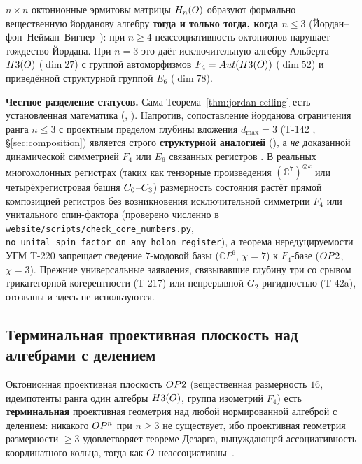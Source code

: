 \begin{theorem}
\label{thm:jordan-ceiling}
$n\times n$ октонионные эрмитовы матрицы $H_n(O)$ образуют
формально вещественную йорданову алгебру \textbf{тогда и только тогда, когда
$n\leq 3$} (Йордан--фон~Нейман--Вигнер~\cite{jordan1934}): при $n\geq 4$
неассоциативность октонионов нарушает тождество Йордана. При $n=3$ это даёт
исключительную алгебру Альберта $H3(O)$ ($\dim 27$) с группой автоморфизмов
$F_4=Aut(H3(O))$ ($\dim 52$) и приведённой структурной группой $E_6$
($\dim 78$).
\end{theorem}

\noindent\textbf{Честное разделение статусов.} Сама
Теорема~\ref{thm:jordan-ceiling} есть установленная математика (,
\cite{jordan1934,baez2002}). Напротив, сопоставление йорданова ограничения
ранга $n\le 3$ с проектным пределом глубины вложения $d_{\max}=3$ (T-142
, \S\ref{sec:composition}) является строго \textbf{структурной
аналогией} (), а \emph{не} доказанной динамической симметрией $F_4$
или $E_6$ связанных регистров \DM{}. В реальных многохолонных регистрах (таких
как тензорные произведения $(\mathbb{C}^7)^{\otimes k}$ или четырёхрегистровая
башня $C_0$--$C_3$) размерность состояния растёт прямой композицией
регистров без возникновения исключительной симметрии $F_4$ или унитального
спин-фактора (проверено численно в
\texttt{website/scripts/check\_core\_numbers.py},
\texttt{no\_unital\_spin\_factor\_on\_any\_holon\_register}), а теорема
нередуцируемости УГМ T-220 запрещает сведение $7$-модовой базы ($\mathbb{C}P^6$,
$\chi=7$) к $F_4$-базе ($OP2$, $\chi=3$). Прежние универсальные заявления,
связывавшие глубину три со срывом трикатегорной когерентности (T-217) или
непрерывной $G_2$-ригидностью (T-42a), отозваны и здесь не используются.

\subsection{Терминальная проективная плоскость над алгебрами с делением}
\label{subsec:terminal}

\begin{theorem}
\label{thm:terminal}
Октонионная проективная плоскость $OP2$ (вещественная размерность $16$,
идемпотенты ранга один алгебры $H3(O)$, группа изометрий $F_4$) есть
\textbf{терминальная} проективная геометрия над любой нормированной алгеброй с
делением: никакого $O P^n$ при $n\geq 3$ не существует, ибо проективная
геометрия размерности $\geq 3$ удовлетворяет теореме Дезарга, вынуждающей
ассоциативность координатного кольца, тогда как $O$
неассоциативны~\cite{baez2002}.
\end{theorem}

